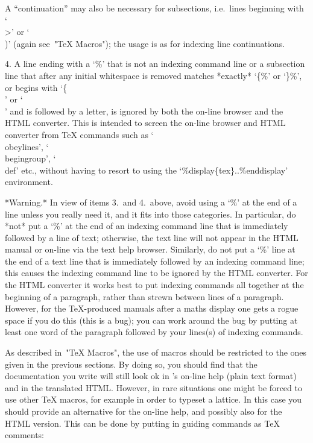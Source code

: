 A ``continuation'' may also  be  necessary  for  subsections,  i.e.~lines
beginning with `\\>' or `\\)' (again see~"TeX Macros"); the usage  is  as
for indexing line continuations.

\item{4.}
A line ending with a `\%' that is not  an  indexing  command  line  or  a
subsection line that after any  initial  whitespace  is  removed  matches
*exactly* `\{\%' or `\}\%', or begins with `\{\\' or `\\' and is followed
by a letter, is  ignored  by  both  the  on-line  browser  and  the  HTML
converter. This is intended  to  screen  the  on-line  browser  and  HTML
converter from {\TeX} commands  such  as  `\\obeylines',  `\\begingroup',
`\\def'   etc.,   without    having    to    resort    to    using    the
`\%display\{tex\}..\%enddisplay' environment.

\endlist

*Warning.* In view of items 3.~and 4.~above, avoid using a  `\%'  at  the
end of a line  unless  you  really  need  it,  and  it  fits  into  those
categories. In particular, do *not* put a `\%' at the end of an  indexing
command line that is immediately followed by a line of  text;  otherwise,
the text line will not appear in the HTML manual or on-line via the  text
help browser. Similarly, do not put a `\%' line at the end of a text line
that is immediately followed by an indexing command line; this causes the
indexing command line to be ignored by the HTML converter. For  the  HTML
converter it works best to put indexing  commands  all  together  at  the
beginning  of  a  paragraph,  rather  than  strewn  between  lines  of  a
paragraph. However, for the {\TeX}-produced manuals after a maths display
one gets a rogue space if you do this (this  is  a  bug);  you  can  work
around the bug by putting at least one word of the paragraph followed  by
your lines(s) of indexing commands.


As described in~"TeX Macros", the use of macros should be  restricted  to
the ones given in the previous sections. By doing  so,  you  should  find
that the documentation you write will still look ok in  {\GAP}'s  on-line
help (plain text format) and in the translated  HTML.  However,  in  rare
situations one might be forced to use other {\TeX} macros, for example in
order  to  typeset  a  lattice.  In  this  case  you  should  provide  an
alternative for the on-line help, and possibly also for the HTML version.
This can be done by putting in guiding commands as {\TeX} comments:

